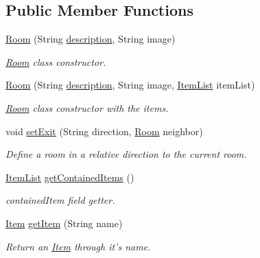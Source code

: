 \subsection*{Public Member Functions}
\begin{DoxyCompactItemize}
\item 
\hyperlink{classpkg__world_1_1Room_ae48ca6830c8c9368ab1cb7e9b006d157}{Room} (String \hyperlink{classpkg__world_1_1Room_a029ab15b9217139d350f3a6980e49a93}{description}, String image)
\begin{DoxyCompactList}\small\item\em \hyperlink{classpkg__world_1_1Room}{Room} class constructor. \end{DoxyCompactList}\item 
\hyperlink{classpkg__world_1_1Room_a0f95ea70b403217118bf7d5c1f0aebaf}{Room} (String \hyperlink{classpkg__world_1_1Room_a029ab15b9217139d350f3a6980e49a93}{description}, String image, \hyperlink{classpkg__world_1_1ItemList}{Item\-List} item\-List)
\begin{DoxyCompactList}\small\item\em \hyperlink{classpkg__world_1_1Room}{Room} class constructor with the items. \end{DoxyCompactList}\item 
void \hyperlink{classpkg__world_1_1Room_a4a97591f3b574b3d0086843a919a0214}{set\-Exit} (String direction, \hyperlink{classpkg__world_1_1Room}{Room} neighbor)
\begin{DoxyCompactList}\small\item\em Define a room in a relative direction to the current room. \end{DoxyCompactList}\item 
\hyperlink{classpkg__world_1_1ItemList}{Item\-List} \hyperlink{classpkg__world_1_1Room_a969205a4d2d2d9e30d1e1db9fc3f0b43}{get\-Contained\-Items} ()
\begin{DoxyCompactList}\small\item\em contained\-Item field getter. \end{DoxyCompactList}\item 
\hyperlink{classpkg__world_1_1Item}{Item} \hyperlink{classpkg__world_1_1Room_a8624c98bd006830d4484dae2dcd8c8e7}{get\-Item} (String name)
\begin{DoxyCompactList}\small\item\em Return an \hyperlink{classpkg__world_1_1Item}{Item} through it's name. \end{DoxyCompactList}\item 

\end{DoxyCompactItemize}
